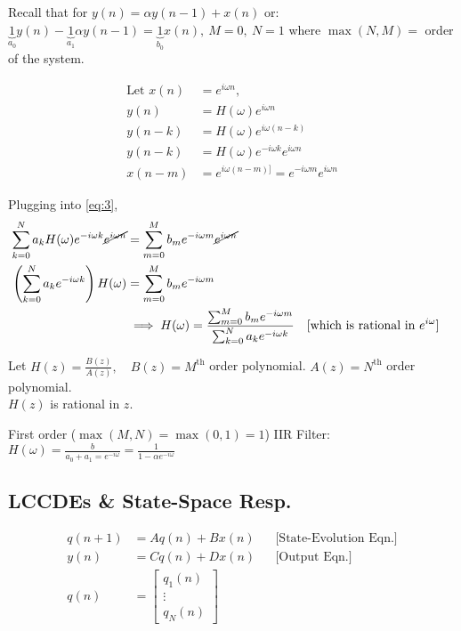 Recall that for $y(n) = \alpha y(n-1) + x(n)$ or:\\
$\underbrace{1}_{a_0}y(n) - \underbrace{1}_{a_1}\alpha y(n-1) = \underbrace{1}_{b_0}x(n),\ M=0,\ N=1$ where $\max(N, M) = $ order of the system.

    
\begin{align*}
    \text{Let } x(n) 
    &=
    e^{i\omega n},
    \\
    y(n) 
    &= 
    H(\omega)e^{i\omega n}
    \\
    y(n-k) 
    &= 
    H(\omega)e^{i\omega (n-k)}
    \\
    y(n-k) 
    &= 
    H(\omega)e^{-i\omega k} e^{i\omega n}
    \\
    x(n-m) 
    &= 
    e^{i\omega(n-m)]} = e^{-i\omega m}e^{i\omega n}
\end{align*}

Plugging into \eqref{eq:3},
\begin{align*}
    \sum_{k=0}^N a_k H(\omega)e^{-i\omega k}\cancel{e^{i\omega n}}
    &=
    \sum_{m=0}^M b_m e^{-i\omega m}\cancel{e^{i\omega n}}
    \\
    \left(\sum_{k=0}^N a_k e^{-i\omega k}\right)H(\omega)
    &=
    \sum_{m=0}^M b_m e^{-i\omega m}
    \\
    &\implies
    H(\omega)
    = 
    \frac{\sum_{m=0}^M b_m e^{-i\omega m}}{\sum_{k=0}^N a_k e^{-i\omega k}}
    &&\text{[which is rational in $e^{i\omega}$]}
\end{align*}

Let $H(z)=\frac{B(z)}{A(z)},\quad B(z)=M^{\text{th}}$ order polynomial. 
$A(z)=N^{\text{th}}$ order polynomial.\\
$H(z)$ is rational in $z$.

First order ($\max(M,N)=\max(0,1)=1$) IIR Filter: $H(\omega)=\frac b{a_0+a_1= e^{-i\omega}} = \frac1{1-\alpha e^{-i\omega}}$

\subsection{LCCDEs \& State-Space Resp.}
\begin{align*}
    q(n+1) 
    &= Aq(n)+Bx(n)
    &&\text{[State-Evolution Eqn.]}
    \\
    y(n) 
    &= Cq(n) + Dx(n)
    &&\text{[Output Eqn.]}
    \\
    q(n)
    &=\begin{bmatrix}
        q_1(n)
        \\
        \vdots
        \\
        q_N(n)
    \end{bmatrix}
\end{align*}

